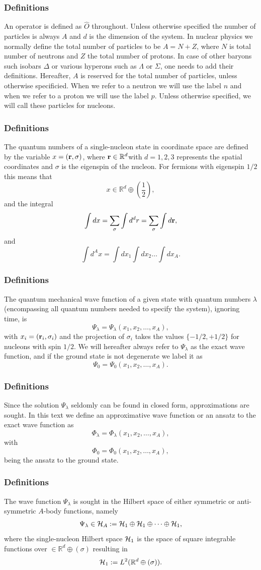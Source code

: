 \documentclass[compress]{beamer}
\begin{document}
\frame
{
\frametitle{Definitions}
An operator is defined as $\hat{O}$ throughout. Unless otherwise
specified the number of particles is always $A$ and $d$ is the dimension of the 
system. 
In nuclear physics we normally define the total number of particles to be $A=N+Z$,
where $N$ is total number of neutrons and $Z$ the total number of protons. In case of other baryons such isobars $\Delta$ or
various hyperons such as $\Lambda$ or $\Sigma$, one needs to add their definitions.  
%
Hereafter, $A$ is reserved for the total number of particles, unless otherwise specificied. When we refer to a neutron we will use the label $n$ and when we refer to a proton we will use the label $p$. Unless otherwise specified, we will call these particles for nucleons.
}



\frame
{
\frametitle{Definitions}
The quantum numbers of a single-nucleon state in coordinate space are
defined by the variable $x=({\bf r},\sigma)$, where ${\bf r}\in {\mathbb{R}}^{d}$with $d=1,2,3$ represents the spatial coordinates and $\sigma$ is the eigenspin of the nucleon. For fermions with eigenspin $1/2$ this means that
\[
 x\in {\mathbb{R}}^{d}\oplus (\frac{1}{2}),
\]
and the integral
\[
\int dx = \sum_{\sigma}\int d^dr = \sum_{\sigma}\int d{\bf r},
\]
and
\[
\int d^Ax= \int dx_1\int dx_2\dots\int dx_A.
\]

}


\frame
{
\frametitle{Definitions}
The quantum mechanical wave function of a given state with quantum numbers $\lambda$ (encompassing all quantum numbers needed to specify the system), ignoring time, is
\[
\Psi_{\lambda}=\Psi_{\lambda}(x_1,x_2,\dots,x_A),
\]
with $x_i=({\bf r}_i,\sigma_i)$ and the projection of $\sigma_i$ takes the values
$\{-1/2,+1/2\}$ for nucleons with spin $1/2$. 
We will hereafter always refer to $\Psi_{\lambda}$ as the exact wave function, and if the ground state is not degenerate we label it as 
\[
\Psi_0=\Psi_0(x_1,x_2,\dots,x_A).
\]

}


\frame
{
\frametitle{Definitions}
Since the solution $\Psi_{\lambda}$ seldomly can be found in closed form, approximations are sought. In this text we define an approximative wave function or an ansatz to the exact wave function as 
\[
\Phi_{\lambda}=\Phi_{\lambda}(x_1,x_2,\dots,x_A),
\]
with 
\[
\Phi_0=\Phi_0(x_1,x_2,\dots,x_A),
\]
being the ansatz to the ground state.  
}


\frame
{
\frametitle{Definitions}
The wave function $\Psi_{\lambda}$ is sought in the Hilbert space of either symmetric or anti-symmetric $A$-body functions, namely
\[
\Psi_{\lambda}\in {\cal H}_A:= {\cal H}_1\oplus{\cal H}_1\oplus\dots\oplus{\cal H}_1,
\]
where the single-nucleon Hilbert space ${\cal H}_1$ is the space of square integrable functions over
$\in {\mathbb{R}}^{d}\oplus (\sigma)$
resulting in
\[
{\cal H}_1:= L^2(\mathbb{R}^{d}\oplus (\sigma)).
\]
}
\end{document}
